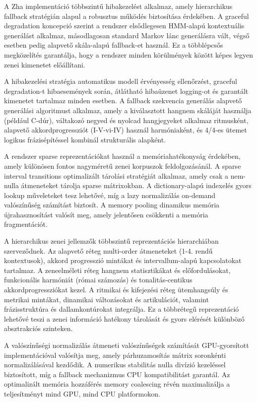 A Zha implementáció többszintű hibakezelést alkalmaz, amely hierarchikus fallback stratégián alapul a robusztus működés biztosítása érdekében. A graceful degradation koncepció szerint a rendszer elsődlegesen HMM-alapú kontextuális generálást alkalmaz, másodlagosan standard Markov lánc generálásra vált, végső esetben pedig alapvető skála-alapú fallback-et használ. Ez a többlépcsős megközelítés garantálja, hogy a rendszer minden körülmények között képes legyen zenei kimenetet előállítani.

A hibakezelési stratégia automatikus modell érvényesség ellenőrzést, graceful degradation-t hibaesemények során, átlátható hibaüzenet logging-ot és garantált kimenetet tartalmaz minden esetben. A fallback szekvencia generálás alapvető generálási algoritmust alkalmaz, amely a kiválasztott hangnem skáláját használja (például C-dúr), váltakozó negyed és nyolcad hangjegyeket alkalmaz ritmusként, alapvető akkordprogressziót (I-V-vi-IV) használ harmóniaként, és 4/4-es ütemet logikus frázisépítéssel kombinál strukturális alapként.

A rendszer sparse reprezentációkat használ a memóriahatékonyság érdekében, amely különösen fontos nagyméretű zenei korpuszok feldolgozásánál. A sparse interval transitions optimalizált tárolási stratégiát alkalmaz, amely csak a nem-nulla átmeneteket tárolja sparse mátrixokban. A dictionary-alapú indexelés gyors lookup műveleteket tesz lehetővé, míg a lazy normalizálás on-demand valószínűség számítást biztosít. A memory pooling dinamikus memória újrahasznosítást valósít meg, amely jelentősen csökkenti a memória fragmentációt.

A hierarchikus zenei jellemzők többszintű reprezentációs hierarchiában szerveződnek. Az alapvető réteg multi-order átmeneteket (1-4. rendű kontextusok), akkord progresszió mintákat és intervallum-alapú kapcsolatokat tartalmaz. A zeneelméleti réteg hangnem statisztikákat és előfordulásokat, funkcionális harmóniát (római számozás) és tonalitás-centikus akkordprogressziókat kezel. A ritmikai és kifejezési réteg ütemhangsúly és metrikai mintákat, dinamikai változásokat és artikulációt, valamint frázisstruktúra és dallamkontúrokat integrálja. Ez a többrétegű reprezentáció lehetővé teszi a zenei információ hatékony tárolását és gyors elérését különböző absztrakciós szinteken.

A valószínűségi normalizálás átmeneti valószínűségek számítását GPU-gyorsított implementációval valósítja meg, amely párhuzamosítás mátrix soronkénti normalizálásával kezdődik. A numerikus stabilitás nulla divízió kezeléssel biztosított, míg a fallback mechanizmus CPU kompatibilitást garantál. Az optimalizált memória hozzáférés memory coalescing révén maximalizálja a teljesítményt mind GPU, mind CPU platformokon.

